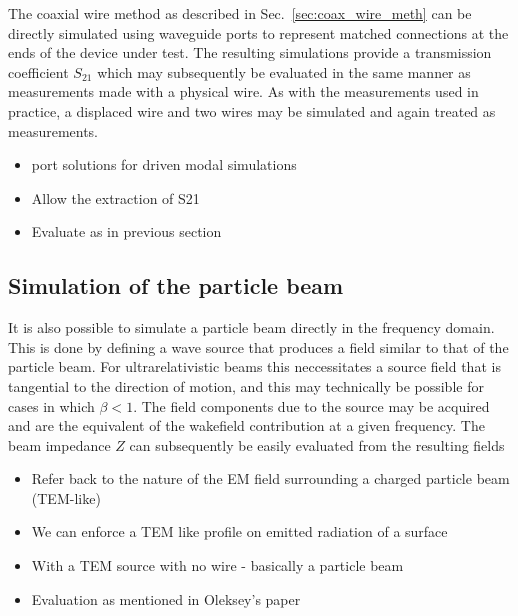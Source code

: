 The coaxial wire method as described in Sec.~\ref{sec:coax_wire_meth} can be directly simulated using waveguide ports to represent matched connections at the ends of the device under test. The resulting simulations provide a transmission coefficient $S_{21}$ which may subsequently be evaluated in the same manner as measurements made with a physical wire. As with the measurements used in practice, a displaced wire and two wires may be simulated and again treated as measurements.

\begin{itemize}
\item{port solutions for driven modal simulations}
\item{Allow the extraction of S21}
\item{Evaluate as in previous section}
\end{itemize}

\subsection{Simulation of the particle beam}

It is also possible to simulate a particle beam directly in the frequency domain. This is done by defining a wave source that produces a field similar to that of the particle beam. For ultrarelativistic beams this neccessitates a source field that is tangential to the direction of motion, and this may technically be possible for cases in which $\beta < 1$. The field components due to the source may be acquired and are the equivalent of the wakefield contribution at a given frequency. The beam impedance $Z$ can subsequently be easily evaluated from the resulting fields

\begin{itemize}
\item{Refer back to the nature of the EM field surrounding a charged particle beam (TEM-like)}
\item{We can enforce a TEM like profile on emitted radiation of a surface}
\item{With a TEM source with no wire - basically a particle beam}
\item{Evaluation as mentioned in Oleksey's paper}
\end{itemize}